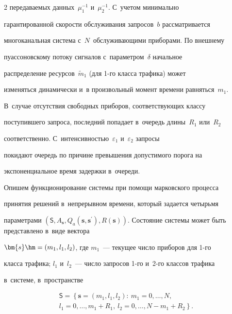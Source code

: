 \begin{multicols}{2}
передаваемых данных~$\mu_1^{-1}$ и~$\mu_2^{-1}$. С~учетом минимально 


гарантированной скорости обслуживания запросов~$b$ рассматривается 


многоканальная система с~$N$~обслуживающими приборами. По внешнему 


пуассоновскому потоку сигналов с~параметром~$\delta$ начальное 


распределение ресурсов~$\tilde{m}_1$ (для 1-го класса трафика) может 


изменяться динамически и~в произвольный момент времени равняться~$m_1$. 


В~случае отсутствия свободных приборов, соответствующих классу 


поступившего запроса, последний попадает в~очередь длины~$R_1$ или~$R_2$ 


соответственно. С~интенсивностью~$\varepsilon_1$ и~$\varepsilon_2$ запросы 


покидают очередь по причине превышения допустимого порога на 


экспоненциальное время задержки в~оче\-реди. 


  


  Опишем функционирование системы при помощи марковского процесса 


принятия решений в~непрерывном времени, который задается четырьмя 


параметрами $\left( \mathsf{S}, A_{\bm{s}}, Q_a(\bm{s},\bm{s}^\prime), 


R(\bm{s})\right)$. Состояние системы может быть представлено в~виде вектора 


$\bm{s}\hm= (m_1, l_1, l_2)$, где $m_1$~--- текущее число приборов для 1-го 


класса трафика; $l_1$ и~$l_2$~--- число запросов \mbox{1-го} и~2-го классов трафика 


в~системе, в~пространстве 


  \begin{multline*}


  \mathsf{S}=\left\{ \bm{s}=\left( m_1,l_1,l_2\right):\ m_1=0,\ldots , N,\right.\\


 \!\! \left. l_1=0, \ldots , m_1+R_1,\ l_2=0, \ldots , N-m_1+R_2\right\}\!.\!\!




  \end{multline*}



\end{multicols}
